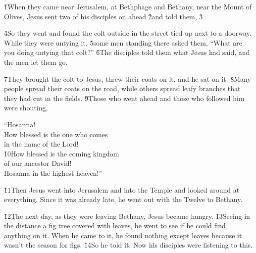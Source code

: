 \v{1}When they came near Jerusalem, at Bethphage and Bethany, near the Mount of Olives, Jesus sent two of his disciples on ahead \v{2}and told them,  \v{3}

\v{4}So they went and found the colt outside in the street tied up next to a doorway. While they were untying it, \v{5}some men standing there asked them, ``What are you doing untying that colt?'' \v{6}The disciples told them what Jesus had said, and the men let them go.

\v{7}They brought the colt to Jesus, threw their coats on it, and he sat on it. \v{8}Many people spread their coats on the road, while others spread leafy branches that they had cut in the fields. \v{9}Those who went ahead and those who followed him were shouting,

\begin{poetry}
\poeml ``Hosanna! \\
\poeml How blessed is the one who comes \\
\poemll    in the name of the Lord! \\
\poeml \v{10}How blessed is the coming kingdom \\
\poemll    of our ancestor David! \\
\poeml Hosanna in the highest heaven!''
\end{poetry}

\v{11}Then Jesus went into Jerusalem and into the Temple and looked around at everything. Since it was already late, he went out with the Twelve to Bethany.

\v{12}The next day, as they were leaving Bethany, Jesus became hungry. \v{13}Seeing in the distance a fig tree covered with leaves, he went to see if he could find anything on it. When he came to it, he found nothing except leaves because it wasn't the season for figs. \v{14}So he told it,  Now his disciples were listening to this.


